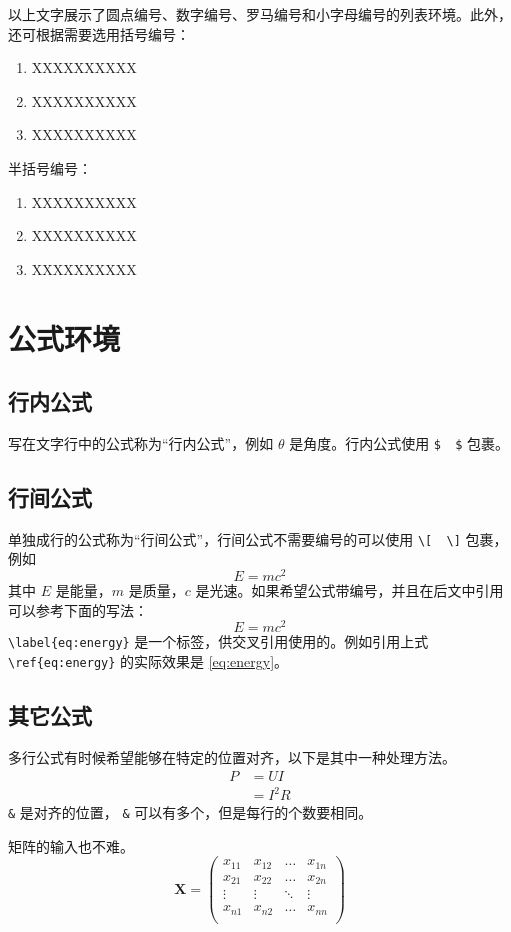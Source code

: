 以上文字展示了圆点编号、数字编号、罗马编号和小字母编号的列表环境。此外，还可根据需要选用括号编号：
\begin{enumerate}[label=(\arabic*)]
 \item XXXXXXXXXX
 \item XXXXXXXXXX
 \item XXXXXXXXXX
\end{enumerate}
半括号编号：
\begin{enumerate}[label=\arabic*)]
 \item XXXXXXXXXX
 \item XXXXXXXXXX
 \item XXXXXXXXXX
\end{enumerate}

\chapter{公式环境}

\section{行内公式}
写在文字行中的公式称为“行内公式”，例如 $ \theta $ 是角度。行内公式使用 \verb|$  $| 包裹。

\section{行间公式}
单独成行的公式称为“行间公式”，行间公式不需要编号的可以使用 \verb|\[  \]| 包裹，例如
\[
E=mc^2
\]
其中 $E$ 是能量，$m$ 是质量，$c$ 是光速。如果希望公式带编号，并且在后文中引用可以参考下面的写法：
\begin{equation}\label{eq:energy}
E=mc^2
\end{equation}
\verb|\label{eq:energy}| 是一个标签，供交叉引用使用的。例如引用上式 \verb|\ref{eq:energy}| 的实际效果是 \ref{eq:energy}。

\section{其它公式}
多行公式有时候希望能够在特定的位置对齐，以下是其中一种处理方法。
\begin{align}
P & = UI \\
& = I^2R
\end{align}
\verb|&| 是对齐的位置， \verb|&| 可以有多个，但是每行的个数要相同。

矩阵的输入也不难。
\[
\mathbf{X} = \left(
    \begin{array}{cccc}
    x_{11} & x_{12} & \ldots & x_{1n}\\
    x_{21} & x_{22} & \ldots & x_{2n}\\
    \vdots & \vdots & \ddots & \vdots\\
    x_{n1} & x_{n2} & \ldots & x_{nn}\\
    \end{array} \right)
\]

